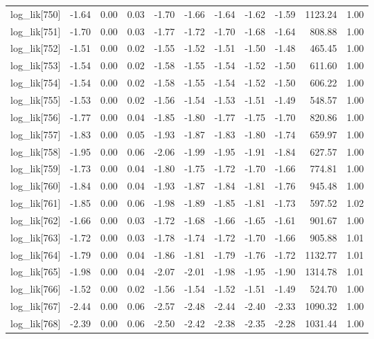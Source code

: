 \begin{table}[ht]
\begin{tabular}{rrrrrrrrrrr}
  log\_lik[750] & -1.64 & 0.00 & 0.03 & -1.70 & -1.66 & -1.64 & -1.62 & -1.59 & 1123.24 & 1.00 \\ 
  log\_lik[751] & -1.70 & 0.00 & 0.03 & -1.77 & -1.72 & -1.70 & -1.68 & -1.64 & 808.88 & 1.00 \\ 
  log\_lik[752] & -1.51 & 0.00 & 0.02 & -1.55 & -1.52 & -1.51 & -1.50 & -1.48 & 465.45 & 1.00 \\ 
  log\_lik[753] & -1.54 & 0.00 & 0.02 & -1.58 & -1.55 & -1.54 & -1.52 & -1.50 & 611.60 & 1.00 \\ 
  log\_lik[754] & -1.54 & 0.00 & 0.02 & -1.58 & -1.55 & -1.54 & -1.52 & -1.50 & 606.22 & 1.00 \\ 
  log\_lik[755] & -1.53 & 0.00 & 0.02 & -1.56 & -1.54 & -1.53 & -1.51 & -1.49 & 548.57 & 1.00 \\ 
  log\_lik[756] & -1.77 & 0.00 & 0.04 & -1.85 & -1.80 & -1.77 & -1.75 & -1.70 & 820.86 & 1.00 \\ 
  log\_lik[757] & -1.83 & 0.00 & 0.05 & -1.93 & -1.87 & -1.83 & -1.80 & -1.74 & 659.97 & 1.00 \\ 
  log\_lik[758] & -1.95 & 0.00 & 0.06 & -2.06 & -1.99 & -1.95 & -1.91 & -1.84 & 627.57 & 1.00 \\ 
  log\_lik[759] & -1.73 & 0.00 & 0.04 & -1.80 & -1.75 & -1.72 & -1.70 & -1.66 & 774.81 & 1.00 \\ 
  log\_lik[760] & -1.84 & 0.00 & 0.04 & -1.93 & -1.87 & -1.84 & -1.81 & -1.76 & 945.48 & 1.00 \\ 
  log\_lik[761] & -1.85 & 0.00 & 0.06 & -1.98 & -1.89 & -1.85 & -1.81 & -1.73 & 597.52 & 1.02 \\ 
  log\_lik[762] & -1.66 & 0.00 & 0.03 & -1.72 & -1.68 & -1.66 & -1.65 & -1.61 & 901.67 & 1.00 \\ 
  log\_lik[763] & -1.72 & 0.00 & 0.03 & -1.78 & -1.74 & -1.72 & -1.70 & -1.66 & 905.88 & 1.01 \\ 
  log\_lik[764] & -1.79 & 0.00 & 0.04 & -1.86 & -1.81 & -1.79 & -1.76 & -1.72 & 1132.77 & 1.01 \\ 
  log\_lik[765] & -1.98 & 0.00 & 0.04 & -2.07 & -2.01 & -1.98 & -1.95 & -1.90 & 1314.78 & 1.01 \\ 
  log\_lik[766] & -1.52 & 0.00 & 0.02 & -1.56 & -1.54 & -1.52 & -1.51 & -1.49 & 524.70 & 1.00 \\ 
  log\_lik[767] & -2.44 & 0.00 & 0.06 & -2.57 & -2.48 & -2.44 & -2.40 & -2.33 & 1090.32 & 1.00 \\ 
  log\_lik[768] & -2.39 & 0.00 & 0.06 & -2.50 & -2.42 & -2.38 & -2.35 & -2.28 & 1031.44 & 1.00 \\ 

\end{tabular}
\end{table}
